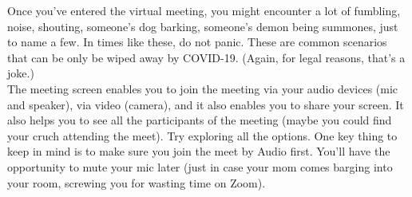 \documentclass[14pt]{report}
\begin{document}
                            Once you've entered the virtual meeting, you might encounter a lot of fumbling, noise, shouting, someone's dog barking, someone's demon being summones, just to name a few. In times like these, do not panic. These are common scenarios that can be only be wiped away by COVID-19. (Again, for legal reasons, that's a joke.)\\

                            The meeting screen enables you to join the meeting via your audio devices (mic and speaker), via video (camera), and it also enables you to share your screen. It also helps you to see all the participants of the meeting (maybe you could find your cruch attending the meet). Try exploring all the options. One key thing to keep in mind is to make sure you join the meet by Audio first. You'll have the opportunity to mute your mic later (just in case your mom comes barging into your room, screwing you for wasting time on Zoom).\\
\end{document}
